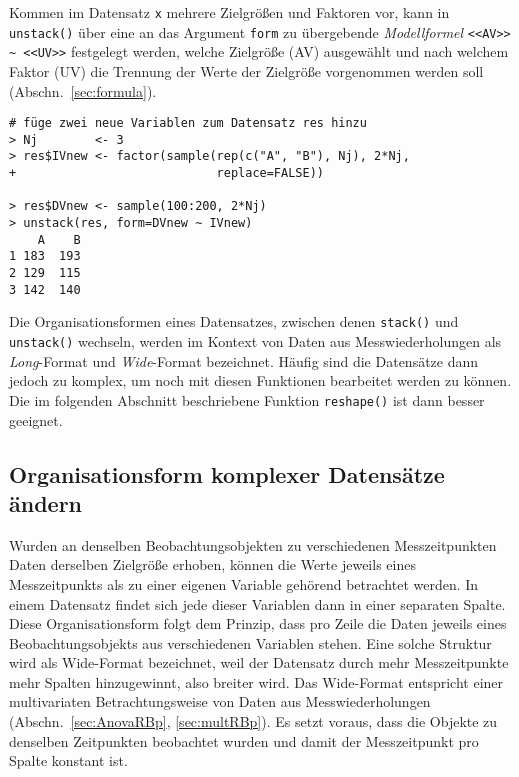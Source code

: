 Kommen im Datensatz \lstinline!x! mehrere Zielgrößen und Faktoren vor, kann in \lstinline!unstack()! über eine an das Argument \lstinline!form! zu übergebende \emph{Modellformel} \lstinline!<<AV>> ~ <<UV>>! festgelegt werden, welche Zielgröße (AV) ausgewählt und nach welchem Faktor (UV) die Trennung der Werte der Zielgröße vorgenommen werden soll (Abschn.\ \ref{sec:formula}).
\begin{lstlisting}
# füge zwei neue Variablen zum Datensatz res hinzu
> Nj        <- 3
> res$IVnew <- factor(sample(rep(c("A", "B"), Nj), 2*Nj,
+                            replace=FALSE))

> res$DVnew <- sample(100:200, 2*Nj)
> unstack(res, form=DVnew ~ IVnew)
    A    B
1 183  193
2 129  115
3 142  140
\end{lstlisting}

Die Organisationsformen eines Datensatzes, zwischen denen \lstinline!stack()! und \lstinline!unstack()! wechseln, werden im Kontext von Daten aus Messwiederholungen als \emph{Long}-Format und \emph{Wide}-Format bezeichnet. Häufig sind die Datensätze dann jedoch zu komplex, um noch mit diesen Funktionen bearbeitet werden zu können. Die im folgenden Abschnitt beschriebene Funktion \lstinline!reshape()! ist dann besser geeignet.

\subsection{Organisationsform komplexer Datensätze ändern}
\label{sec:reshape}

Wurden an denselben Beobachtungsobjekten zu verschiedenen Messzeitpunkten Daten derselben Zielgröße erhoben, können die Werte jeweils eines Messzeitpunkts als zu einer eigenen Variable gehörend betrachtet werden. In einem Datensatz findet sich jede dieser Variablen dann in einer separaten Spalte. Diese Organisationsform folgt dem Prinzip, dass pro Zeile die Daten jeweils eines Beobachtungsobjekts aus verschiedenen Variablen stehen. Eine solche Struktur wird als Wide-Format bezeichnet, weil der Datensatz durch mehr Messzeitpunkte mehr Spalten hinzugewinnt, also breiter wird. Das Wide-Format entspricht einer multivariaten Betrachtungsweise von Daten aus Messwiederholungen (Abschn.\ \ref{sec:AnovaRBp}, \ref{sec:multRBp}). Es setzt voraus, dass die Objekte zu denselben Zeitpunkten beobachtet wurden und damit der Messzeitpunkt pro Spalte konstant ist.

